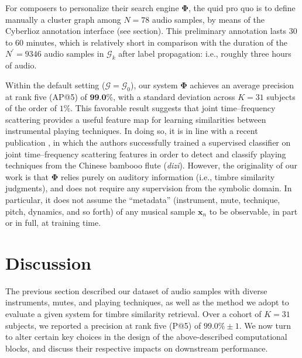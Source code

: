 \documentclass{bmcart}
\newcommand{\lnameref}[1]{%
\bgroup
\let\nmu\MakeLowercase
\nameref{#1}\egroup}
\newcommand{\nmu}{}
\begin{document}
For composers to personalize their search engine $\mathbf{\Phi}$, the quid pro quo is to define manually a cluster graph among $N=78$ audio samples, by means of the Cyberlioz annotation interface (see \lnameref{sec:survey} section).
This preliminary annotation lasts $30$ to $60$ minutes, which is relatively short in comparison with the duration of the $N^\prime = 9346$ audio samples in $\mathcal{G}_k$ after label propagation: i.e., roughly three hours of audio.

Within the default setting ($\mathcal{G}=\mathcal{G}_0$), our system $\mathbf{\Phi}$ achieves an average precision at rank five (AP@5) of $\textbf{99.0\%}$, with a standard deviation across $K=31$ subjects of the order of $1\%$.
This favorable result suggests that joint time--frequency scattering provides a useful feature map for learning similarities between instrumental playing techniques.
In doing so, it is in line with a recent publication \cite{wang2020icassp}, in which the authors successfully trained a supervised classifier on joint time--frequency scattering features in order to detect and classify playing techniques from the Chinese bambooo flute (\emph{dizi}).
However, the originality of our work is that $\mathbf{\Phi}$ relies purely on auditory information (i.e., timbre similarity judgments), and does not require any supervision from the symbolic domain.
In particular, it does not assume the ``metadata'' (instrument, mute, technique, pitch, dynamics, and so forth) of any musical sample $\boldsymbol{x}_n$ to be observable, in part or in full, at training time.



\section*{\nmu Discussion}
\label{sec:discussion}

The previous section described our dataset of audio samples with diverse instruments, mutes, and playing techniques, as well as the method we adopt to evaluate a given system for timbre similarity retrieval.
Over a cohort of $K=31$ subjects, we reported a precision at rank five (P@5) of $99.0\% \pm 1$.
We now turn to alter certain key choices in the design of the above-described computational blocks, and discuss their respective impacts on downstream performance.
\end{document}

